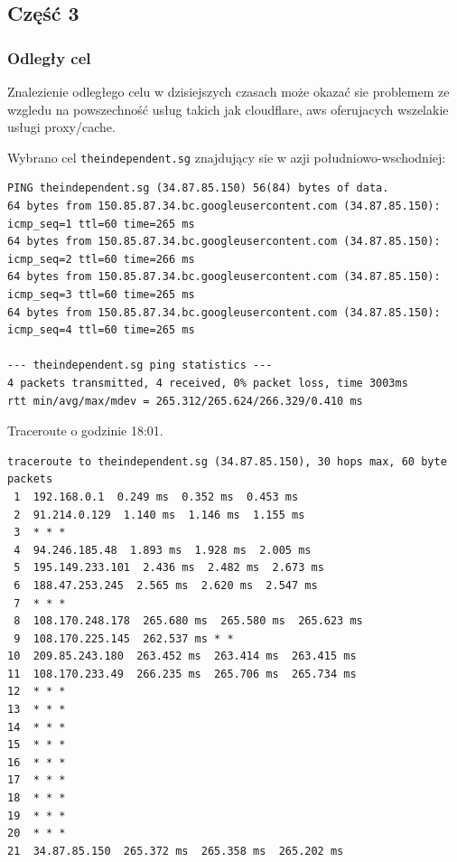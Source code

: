 \documentclass[11pt]{article}
\begin{document}
\subsection{Część 3}
\label{sec:org292094d}
\subsubsection{Odległy cel}
\label{sec:org8213922}
Znalezienie odległego celu w dzisiejszych czasach może okazać sie problemem ze wzgledu na powszechność usług takich jak cloudflare, aws oferujacych wszelakie usługi proxy/cache.

Wybrano cel \texttt{theindependent.sg} znajdujący sie w azji południowo-wschodniej:
\begin{verbatim}
PING theindependent.sg (34.87.85.150) 56(84) bytes of data.
64 bytes from 150.85.87.34.bc.googleusercontent.com (34.87.85.150): icmp_seq=1 ttl=60 time=265 ms
64 bytes from 150.85.87.34.bc.googleusercontent.com (34.87.85.150): icmp_seq=2 ttl=60 time=266 ms
64 bytes from 150.85.87.34.bc.googleusercontent.com (34.87.85.150): icmp_seq=3 ttl=60 time=265 ms
64 bytes from 150.85.87.34.bc.googleusercontent.com (34.87.85.150): icmp_seq=4 ttl=60 time=265 ms

--- theindependent.sg ping statistics ---
4 packets transmitted, 4 received, 0% packet loss, time 3003ms
rtt min/avg/max/mdev = 265.312/265.624/266.329/0.410 ms
\end{verbatim}

Traceroute o godzinie 18:01.
\begin{verbatim}
traceroute to theindependent.sg (34.87.85.150), 30 hops max, 60 byte packets
 1  192.168.0.1  0.249 ms  0.352 ms  0.453 ms
 2  91.214.0.129  1.140 ms  1.146 ms  1.155 ms
 3  * * *
 4  94.246.185.48  1.893 ms  1.928 ms  2.005 ms
 5  195.149.233.101  2.436 ms  2.482 ms  2.673 ms
 6  188.47.253.245  2.565 ms  2.620 ms  2.547 ms
 7  * * *
 8  108.170.248.178  265.680 ms  265.580 ms  265.623 ms
 9  108.170.225.145  262.537 ms * *
10  209.85.243.180  263.452 ms  263.414 ms  263.415 ms
11  108.170.233.49  266.235 ms  265.706 ms  265.734 ms
12  * * *
13  * * *
14  * * *
15  * * *
16  * * *
17  * * *
18  * * *
19  * * *
20  * * *
21  34.87.85.150  265.372 ms  265.358 ms  265.202 ms
\end{verbatim}
\end{document}
